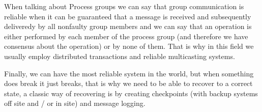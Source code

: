 When talking about Process groups we can say that group communication is reliable when it can be guaranteed that a message is received and subsequently deliveredy by all nonfaulty group members and we can say that an operation is either performed by each member of the process group (and therefore we have consensus about the operation) or by none of them. That is why in this field we usually employ distributed transactions and reliable multicasting systems.

Finally, we can have the most reliable system in the world, but when something does break it just breaks, that is why we need to be able to recover to a correct state, a classic way of recovering is by creating checkpoints (with backup systems off site and / or in site) and message logging.
